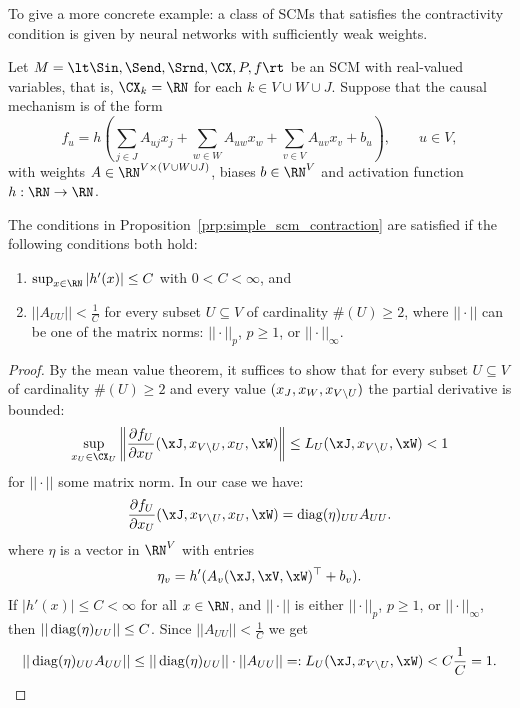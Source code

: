 To give a more concrete example: a class of SCMs that satisfies the contractivity condition is given by neural networks with sufficiently weak weights.
\begin{Eg}
  Let $M = \lt \Sin, \Send, \Srnd, \CX, P, f \rt$ be an SCM with real-valued variables, that is, $\CX_k = \RN$ for each $k \in V \cup W \cup J$.
  Suppose that the causal mechanism is of the form
  $$f_u = h\left(\sum_{j \in J} A_{uj} x_j + \sum_{w \in W} A_{uw} x_w + \sum_{v \in V} A_{uv} x_v + b_u\right),\qquad u\in V,$$
  with weights $A \in \RN^{V \times (V \cup W \cup J)}$, biases $b \in \RN^V$ and activation function $h : \RN \to \RN$.

  The conditions in Proposition~\ref{prp:simple_scm_contraction} are satisfied if the following conditions both hold:
\begin{enumerate}
  \item $\sup_{x\in\RN}|h'(x)| \le C $ with $0 < C < \infty$, and
  \item $|| A_{UU} || < \frac{1}{C}$ for every subset $U \subseteq V$ of cardinality $\#(U) \ge 2$, where $||\cdot||$ can be one of the matrix norms: $||\cdot||_p$, $p \ge 1$, or $||\cdot||_\infty$.
\end{enumerate}
\end{Eg}
\begin{proof}
  By the mean value theorem, it suffices to show that for every subset $U \subseteq V$ of cardinality $\#(U) \ge 2$ and every value $(x_J,x_W,x_{V\setminus U})$ the partial derivative is bounded:
  \[ \sup_{x_U\in \CX_U} \left\lVert \frac{\partial f_U}{\partial x_U} (\xJ,x_{V\sm U},x_U,\xW) \right\rVert \le L_U(\xJ,x_{V\sm U},\xW) < 1  \]
for $||\cdot||$ some matrix norm. In our case we have: 
  $$\frac{\partial f_U}{\partial x_U} (\xJ,x_{V\sm U},x_U,\xW) = \diag(\eta)_{UU} A_{UU}.$$ 
where $\eta$ is a vector in $\RN^V$ with entries
  $$\eta_{v} = h'(A_v (\xJ,\xV,\xW)^\top + b_v).$$
If $|h'(x)| \le C < \infty$ for all $x \in \RN$, and $||\cdot||$ is either $||\cdot||_p$, $p \ge 1$, or $||\cdot||_\infty$, then $||\operatorname*{\mathrm{diag}}(\eta)_{UU}|| \le C$.
Since $||A_{UU}|| < \frac{1}{C}$ we get
  $$|| \diag(\eta)_{UU} A_{UU} || \le ||\diag(\eta)_{UU}|| \cdot ||A_{UU}|| =: L_U(\xJ,x_{V\sm U},\xW) < C \frac{1}{C} = 1.$$
\end{proof}

